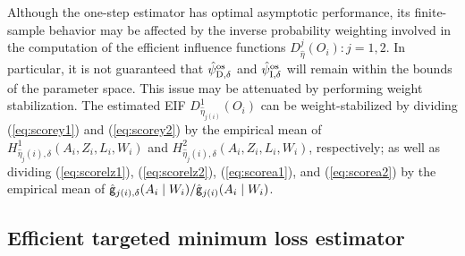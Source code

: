 Although the one-step estimator has optimal asymptotic performance, its
finite-sample behavior may be affected by the inverse probability weighting
involved in the computation of the efficient influence functions
$D_{\hat\eta}^j(O_i):j=1,2$. In particular, it is not guaranteed that $\hat\psi_{\mbox{\scriptsize D}, \delta}^{\mbox{\scriptsize os}}$
and $\hat\psi_{\mbox{\scriptsize I}, \delta}^{\mbox{\scriptsize os}}$ will remain within the bounds of the parameter space. This issue
may be attenuated by performing weight stabilization. The estimated EIF
$D_{\hat\eta_{j(i)}}^1(O_i)$ can be weight-stabilized by dividing
(\ref{eq:scorey1}) and (\ref{eq:scorey2}) by the empirical mean of
$H_{\hat\eta_j(i),\delta}^1(A_i,Z_i,L_i,W_i)$ and
$H_{\hat\eta_j(i),\delta}^2(A_i,Z_i,L_i,W_i)$, respectively; as well as dividing
(\ref{eq:scorelz1}), (\ref{eq:scorelz2}), (\ref{eq:scorea1}), and
(\ref{eq:scorea2}) by the empirical mean of $\hat {\mathsf{g}}_{j(i), \delta}(A_i\mid
W_i)/\hat {\mathsf{g}}_{j(i)}(A_i\mid W_i)$.

\subsection{Efficient targeted minimum loss estimator}

